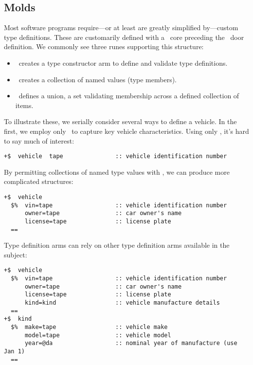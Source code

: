 \begin{lstlisting}[language=hoon,
                   caption={Nock equivalent}]
\end{lstlisting}

\subsection{Molds}



Most software programs require—or at least are greatly simplified by—custom type definitions.  These are customarily defined with a \barcen~core preceding the \barcab~door definition.  We commonly see three runes supporting this structure:

\begin{itemize}
  \item  \lusbuc~creates a type constructor arm to define and validate type definitions.
  \item  \buccen~creates a collection of named values (type members).
  \item  \bucwut~defines a union, a set validating membership across a defined collection of items.
\end{itemize}


To illustrate these, we serially consider several ways to define a vehicle.  In the first, we employ only \lusbuc~to capture key vehicle characteristics.  Using only \lusbuc, it's hard to say much of interest:

\begin{lstlisting}[style=nonumbers]
+$  vehicle  tape               :: vehicle identification number
\end{lstlisting}

By permitting collections of named type values with \buccen, we can produce more complicated structures:

\begin{lstlisting}[style=nonumbers]
+$  vehicle
  $%  vin=tape                  :: vehicle identification number
      owner=tape                :: car owner's name
      license=tape              :: license plate
  ==
\end{lstlisting}

Type definition arms can rely on other type definition arms available in the subject:

\begin{lstlisting}[style=nonumbers]
+$  vehicle
  $%  vin=tape                  :: vehicle identification number
      owner=tape                :: car owner's name
      license=tape              :: license plate
      kind=kind                 :: vehicle manufacture details
  ==
+$  kind
  $%  make=tape                 :: vehicle make
      model=tape                :: vehicle model
      year=@da                  :: nominal year of manufacture (use Jan 1)
  ==
\end{lstlisting}


